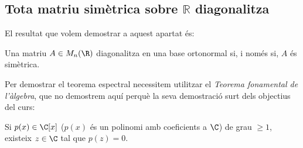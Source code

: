 \subsection{Tota matriu simètrica sobre \texorpdfstring{$\mathbb{R}$}{R} diagonalitza}
El resultat que volem demostrar a aquest apartat és:
\begin{teorema}
Una matriu $A\in M_n(\R)$ diagonalitza en una base ortonormal si, i només si, $A$ és simètrica.
\end{teorema}
Per demostrar el teorema espectral necessitem utilitzar el \emph{Teorema fonamental de l'àlgebra}, que no demostrem aquí perquè la seva demostració surt dels objectius del curs:
\begin{teorema}
Si $p(x)\in\C[x]$ ($p(x)$ és un polinomi amb coeficients a $\C$) de grau $\geq 1$, existeix $z\in \C$ tal que $p(z)=0$.
\end{teorema}
